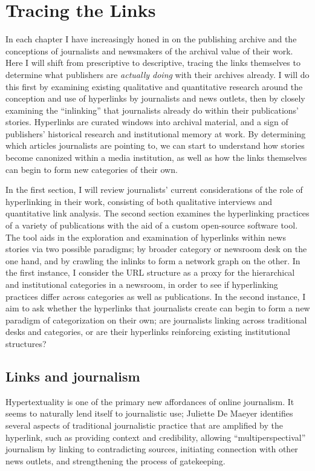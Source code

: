 \chapter{Tracing the Links}

In each chapter I have increasingly honed in on the publishing archive and the conceptions of journalists and newsmakers of the archival value of their work. Here I will shift from prescriptive to descriptive, tracing the links themselves to determine what publishers are \emph{actually doing} with their archives already. I will do this first by examining existing qualitative and quantitative research around the conception and use of hyperlinks by journalists and news outlets, then by closely examining the ``inlinking'' that journalists already do within their publications' stories. Hyperlinks are curated windows into archival material, and a sign of publishers' historical research and institutional memory at work. By determining which articles journalists are pointing to, we can start to understand how stories become canonized within a media institution, as well as how the links themselves can begin to form new categories of their own.

In the first section, I will review journalists' current considerations of the role of hyperlinking in their work, consisting of both qualitative interviews and quantitative link analysis. The second section examines the hyperlinking practices of a variety of publications with the aid of a custom open-source software tool. The tool aids in the exploration and examination of hyperlinks within news stories via two possible paradigms; by broader category or newsroom desk on the one hand, and by crawling the inlinks to form a network graph on the other. In the first instance, I consider the URL structure as a proxy for the hierarchical and institutional categories in a newsroom, in order to see if hyperlinking practices differ across categories as well as publications. In the second instance, I aim to ask whether the hyperlinks that journalists create can begin to form a new paradigm of categorization on their own; are journalists linking across traditional desks and categories, or are their hyperlinks reinforcing existing institutional structures?

\section{Links and journalism}

Hypertextuality is one of the primary new affordances of online journalism.\autocites[See][]{deuze_web_2003}{de_maeyer_towards_2013}{oblak_lack_2005} It seems to naturally lend itself to journalistic use; Juliette De Maeyer identifies several aspects of traditional journalistic practice that are amplified by the hyperlink, such as providing context and credibility, allowing ``multiperspectival'' journalism by linking to contradicting sources, initiating connection with other news outlets, and strengthening the process of gatekeeping.\autocite[9-10]{de_maeyer_methods_2010}

